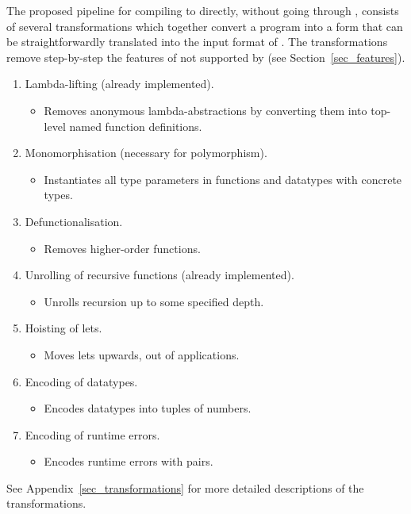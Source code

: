 \documentclass[
    9pt,            %
    techreport,        %
    affiltop,       %
]{art}
\begin{document}
The proposed pipeline for compiling \Juvix{} to \VampIR{} directly, without
going through \Geb{}, consists of several \JuvixCore{} transformations which
together convert a \JuvixCore{} program into a form that can be
straightforwardly translated into the input format of \VampIR{}. The
transformations remove step-by-step the features of \JuvixCore{} not
supported by \VampIR{} (see Section~\ref{sec_features}).
\begin{enumerate}
\item Lambda-lifting (already implemented).
  {\small
  \begin{itemize}
  \item Removes anonymous lambda-abstractions by converting them into
    top-level named function definitions.
  \end{itemize} }
\item Monomorphisation (necessary for polymorphism).
  {\small
    \begin{itemize}
    \item Instantiates all type parameters in functions and datatypes with concrete types.
  \end{itemize} }
\item Defunctionalisation.
  {\small
    \begin{itemize}
    \item Removes higher-order functions.
  \end{itemize} }
\item Unrolling of recursive functions (already implemented).
  {\small
    \begin{itemize}
    \item Unrolls recursion up to some specified depth.
  \end{itemize} }
\item Hoisting of lets.
  {\small
    \begin{itemize}
    \item Moves lets upwards, out of applications.
  \end{itemize} }
\item Encoding of datatypes.
  {\small
    \begin{itemize}
    \item Encodes datatypes into tuples of numbers.
  \end{itemize} }
\item Encoding of runtime errors.
  {\small
    \begin{itemize}
    \item Encodes runtime errors with pairs.
  \end{itemize} }
\end{enumerate}
See Appendix~\ref{sec_transformations} for more detailed descriptions
of the transformations.
\end{document}

